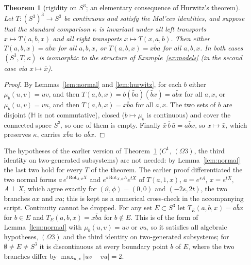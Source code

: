 \documentclass[11pt,reqno]{amsart}
\newtheorem{theorem}{Theorem}[section]
\theoremstyle{definition}
\theoremstyle{remark}
\numberwithin{equation}{section}
\newcommand{\HH}{\mathbb{H}}
\begin{document}
\begin{theorem}[rigidity on $S^3$; an elementary consequence of Hurwitz's theorem]\label{thm:rigid}
Let $T\colon(S^3)^3\to S^3$ be continuous and satisfy the Mal'cev identities, and suppose that the standard comparison $\kappa$ is invariant
under all left transports $x\mapsto T(a,b,x)$ and all right transports $x\mapsto T(x,a,b)$.  Then either $T(a,b,x)=a\bar bx$ for all
$a,b,x$, or $T(a,b,x)=x\bar ba$ for all $a,b,x$.  In both cases $(S^3,T,\kappa)$ is isomorphic to the structure of
Example~\ref{ex:models} (in the second case via $x\mapsto\bar x$).
\end{theorem}
\begin{proof}
By Lemmas~\ref{lem:normal} and \ref{lem:hurwitz}, for each $b$ either $\mu_b(u,v)=uv$, and then $T(a,b,x)=b(\bar ba)(\bar bx)=a\bar bx$ for
all $a,x$, or $\mu_b(u,v)=vu$, and then $T(a,b,x)=x\bar ba$ for all $a,x$.  The two sets of $b$ are disjoint ($\HH$ is not commutative),
closed ($b\mapsto\mu_b$ is continuous) and cover the connected space $S^3$, so one of them is empty.  Finally $\overline{\bar x\,b\,\bar a}=a\bar bx$,
so $x\mapsto\bar x$, which preserves $\kappa$, carries $x\bar ba$ to $a\bar bx$.
\end{proof}

The hypotheses of the earlier version of Theorem~\ref{thm:rigid} ($C^1$, $(\Omega3)$, the third identity on two-generated
subsystems) are not needed: by Lemma~\ref{lem:normal} the last two hold for every $T$ of the theorem.  The earlier proof
differentiated the two normal forms $a\,e^{t\,\mathrm{Rot}_{A,\vartheta}X}$ and $e^{s\,\mathrm{Rot}_{X,\phi}A}e^{tX}$ of $T(a,1,x)$,
$a=e^{sA}$, $x=e^{tX}$, $A\perp X$, which agree exactly for $(\vartheta,\phi)=(0,0)$ and $(-2s,2t)$, the two branches $ax$ and $xa$;
this is kept as a numerical cross-check in the accompanying script.  Continuity cannot be dropped.  For any set $E\subset S^3$ let
$T_E(a,b,x)=a\bar bx$ for $b\in E$ and $T_E(a,b,x)=x\bar ba$ for $b\notin E$.  This is of the form of Lemma~\ref{lem:normal} with
$\mu_b(u,v)=uv$ or $vu$, so it satisfies all algebraic hypotheses, $(\Omega3)$ and the third identity on two-generated subsystems; for
$\emptyset\ne E\ne S^3$ it is discontinuous at every boundary point $b$ of $E$, where the two branches differ by
$\max_{u,v}\lvert uv-vu\rvert=2$.
\end{document}
